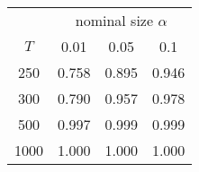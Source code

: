 % 
\begin{tabular}{cccc}
  \hline
  & \multicolumn{3}{c}{nominal size $\alpha$} \\
 $T$ & 0.01 & 0.05 & 0.1 \\
 \hline
250 & 0.758 & 0.895 & 0.946 \\ 
  300 & 0.790 & 0.957 & 0.978 \\ 
  500 & 0.997 & 0.999 & 0.999 \\ 
  1000 & 1.000 & 1.000 & 1.000 \\ 
   \hline
\end{tabular}
